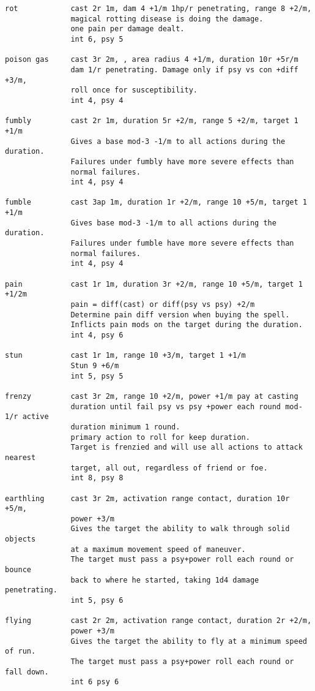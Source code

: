 \begin{verbatim}
rot            cast 2r 1m, dam 4 +1/m 1hp/r penetrating, range 8 +2/m,
               magical rotting disease is doing the damage.
               one pain per damage dealt.
               int 6, psy 5

poison gas     cast 3r 2m, , area radius 4 +1/m, duration 10r +5r/m
               dam 1/r penetrating. Damage only if psy vs con +diff +3/m,
               roll once for susceptibility.
               int 4, psy 4

fumbly         cast 2r 1m, duration 5r +2/m, range 5 +2/m, target 1 +1/m
               Gives a base mod-3 -1/m to all actions during the duration.
               Failures under fumbly have more severe effects than 
               normal failures.
               int 4, psy 4

fumble         cast 3ap 1m, duration 1r +2/m, range 10 +5/m, target 1 +1/m
               Gives base mod-3 -1/m to all actions during the duration.
               Failures under fumble have more severe effects than 
               normal failures.
               int 4, psy 4

pain           cast 1r 1m, duration 3r +2/m, range 10 +5/m, target 1 +1/2m
               pain = diff(cast) or diff(psy vs psy) +2/m
               Determine pain diff version when buying the spell.
               Inflicts pain mods on the target during the duration.
               int 4, psy 6

stun           cast 1r 1m, range 10 +3/m, target 1 +1/m
               Stun 9 +6/m
               int 5, psy 5

frenzy         cast 3r 2m, range 10 +2/m, power +1/m pay at casting
               duration until fail psy vs psy +power each round mod-1/r active
               duration minimum 1 round.
               primary action to roll for keep duration.
               Target is frenzied and will use all actions to attack nearest
               target, all out, regardless of friend or foe.
               int 8, psy 8

earthling      cast 3r 2m, activation range contact, duration 10r +5/m,
               power +3/m
               Gives the target the ability to walk through solid objects
               at a maximum movement speed of maneuver.
               The target must pass a psy+power roll each round or bounce
               back to where he started, taking 1d4 damage penetrating.
               int 5, psy 6

flying         cast 2r 2m, activation range contact, duration 2r +2/m,
               power +3/m
               Gives the target the ability to fly at a minimum speed of run.
               The target must pass a psy+power roll each round or fall down.
               int 6 psy 6


\end{verbatim}
